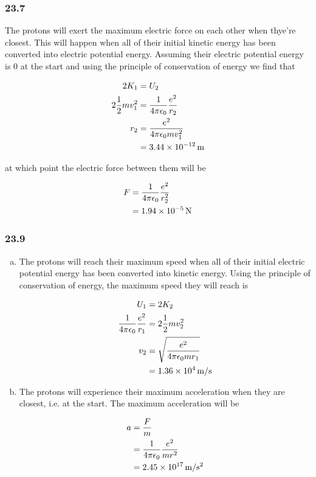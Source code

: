 \documentclass{article}
\begin{document}
\subsubsection{23.7}

The protons will exert the maximum electric force on each other when thye're closest. This will happen when all of their initial kinetic energy has been converted into electric potential energy. Assuming their electric potential energy is $0$ at the start and using the principle of conservation of energy we find that

\begin{align*}
  2 K_1                 & = U_2                                  \\
  2 \frac{1}{2} m v_1^2 & = \frac{1}{4 \pi \epsilon_0} \frac{e^2}{r_2}                  \\
  r_2                   & = \frac{e^2}{4 \pi \epsilon_0 m v_1^2} \\
                        & = \qty{3.44e-12}{m}
\end{align*}

at which point the electric force between them will be

\begin{align*}
  F & = \frac{1}{4 \pi \epsilon_0} \frac{e^2}{r_2^2} \\
    & = \qty{1.94e-5}{N}
\end{align*}

\subsubsection{23.9}

\begin{enumerate}[a)]
  \item The protons will reach their maximum speed when all of their initial electric potential energy has been converted into kinetic energy. Using the principle of conservation of energy, the maximum speed they will reach is

        \begin{align*}
          U_1                 & = 2 K_2                                     \\
          \frac{1}{4 \pi \epsilon_0} \frac{e^2}{r_1} & = 2 \frac{1}{2} m v_2^2                     \\
          v_2                 & = \sqrt{\frac{e^2}{4 \pi \epsilon_0 m r_1}} \\
                              & = \qty{1.36e4}{m/s}
        \end{align*}

  \item The protons will experience their maximum acceleration when they are closest, i.e. at the start. The maximum acceleration will be

        \begin{align*}
          a & = \frac{F}{m}           \\
            & = \frac{1}{4 \pi \epsilon_0} \frac{e^2}{m r^2} \\
            & = \qty{2.45e17}{m/s^2}
        \end{align*}
\end{enumerate}
\end{document}
